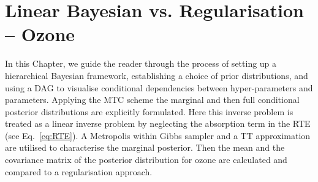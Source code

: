 \chapter{Linear Bayesian vs. Regularisation -- Ozone}
\label{ch:LinVsReg}
\thispagestyle{empty}

In this Chapter, we guide the reader through the process of setting up a hierarchical Bayesian framework, establishing a choice of prior distributions, and using a DAG to visualise conditional dependencies between hyper-parameters and parameters.
Applying the MTC scheme the marginal and then full conditional posterior distributions are explicitly formulated.
Here this inverse problem is treated as a linear inverse problem by neglecting the absorption term in the RTE (see Eq.~\ref{eq:RTE}).
A Metropolis within Gibbs sampler and a TT approximation are utilised to characterise the marginal posterior.
Then the mean and the covariance matrix of the posterior distribution for ozone are calculated and compared to a regularisation approach.


